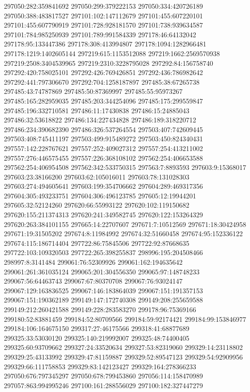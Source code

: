 297050:282:359841692
297050:299:379222153
297050:334:420726189
297050:388:483817527
297101:102:147112679
297101:455:607220101
297101:455:607790919
297101:728:928181570
297101:738:939634587
297101:784:985250939
297101:789:991584339
297178:46:64132042
297178:95:133447386
297178:308:413994807
297178:1094:1282966481
297178:1219:1402605144
297219:615:1153512088
297219:1662:2569570938
297219:2508:3404539965
297219:2310:3228795028
297292:84:156758740
297292:420:758025101
297292:426:769426851
297292:436:786982642
297292:441:797306670
297292:704:1258187897
297485:38:67265738
297485:43:74787869
297485:50:87369997
297485:55:95973267
297485:165:282959035
297485:203:344254096
297485:175:299559847
297485:196:332710581
297486:11:17430838
297486:15:24885043
297486:32:53618822
297486:134:227434828
297486:189:318220712
297486:234:390682390
297486:326:537264554
297503:407:742609445
297503:408:745411197
297503:499:915489272
297503:450:824340431
297557:142:228767621
297557:252:409027312
297557:254:413211002
297557:276:446575455
297557:226:368108102
297562:254:406653588
297562:254:406954508
297562:342:533750315
297563:7:8893593
297603:9:15368017
297603:23:38166200
297603:62:105016011
297603:78:131028303
297603:274:494605641
297603:199:354706662
297604:289:469317356
297604:305:493233751
297604:306:496123785
297605:12:19944201
297605:32:52124260
297620:66:55993122
297620:102:119150682
297620:155:211374313
297620:241:349582745
297620:122:153264329
297620:263:384101155
297665:14:22707607
297671:7:10512569
297671:18:30424958
297671:19:31505202
297674:8:11984992
297674:32:51660458
297674:95:152336122
297674:115:186714404
297722:86:75845506
297722:92:87668635
297722:103:109320503
297722:265:398255837
298996:195:204508466
298997:8:3141484
299061:76:52309926
299061:162:194635642
299061:261:361035124
299065:201:304556350
299065:97:148748233
299067:56:64463743
299067:67:80370708
299067:76:93024147
299067:129:163836525
299067:146:183864039
299067:151:191357153
299067:151:190362189
299149:147:172740308
299149:208:255659588
299149:212:260421588
299149:228:283583270
299178:96:75369166
299180:52:83881459
299184:52:80709566
299184:59:92174421
299184:99:153846977
299184:106:164675150
299317:27:46175566
299318:41:68877689
299325:33:53030120
299325:140:219992007
299325:48:74400405
299325:60:93709662
299327:24:33520634
299327:53:82319060
299329:14:23118802
299329:25:43133992
299329:47:81159887
299329:52:89547123
299329:54:92909956
299329:66:111758853
299329:83:142123427
299329:164:278366233
297050:676:797345297
297050:678:799453860
297056:114:158470989
297057:863:994995246
297100:161:288556029
297100:182:327447279
